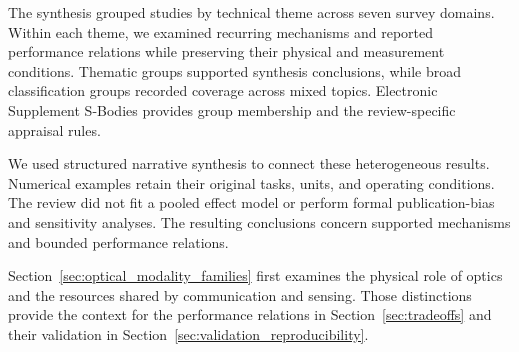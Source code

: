 The synthesis grouped studies by technical theme across seven survey domains.
Within each theme, we examined recurring mechanisms and reported performance
relations while preserving their physical and measurement conditions.
Thematic groups supported synthesis conclusions, while broad classification
groups recorded coverage across mixed topics. Electronic Supplement S-Bodies
provides group membership and the review-specific appraisal rules.

We used structured narrative synthesis to connect these heterogeneous
results. Numerical examples retain their original tasks, units, and operating
conditions. The review did not fit a pooled effect model or perform formal
publication-bias and sensitivity analyses. The resulting conclusions concern
supported mechanisms and bounded performance relations.

Section~\ref{sec:optical_modality_families} first examines the physical role
of optics and the resources shared by communication and sensing.
Those distinctions provide the context for the performance relations in
Section~\ref{sec:tradeoffs} and their validation in
Section~\ref{sec:validation_reproducibility}.
